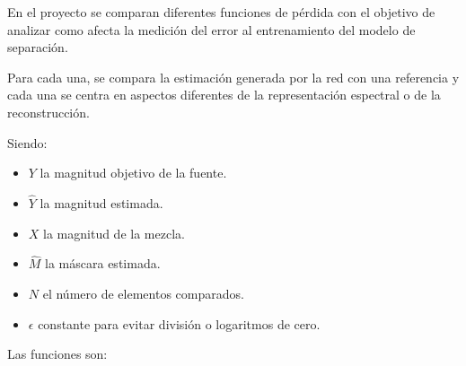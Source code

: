 En el proyecto se comparan diferentes funciones de pérdida con el objetivo de analizar como afecta la medición del error al entrenamiento del modelo de separación.

Para cada una, se compara la estimación generada por la red con una referencia y cada una se centra en aspectos diferentes de la representación espectral o de la reconstrucción.

Siendo:
\begin{itemize}
    \item $Y$ la magnitud objetivo de la fuente.
    \item $\hat{Y}$ la magnitud estimada.
    \item $X$ la magnitud de la mezcla.
    \item $\hat{M}$ la máscara estimada.
    \item $N$ el número de elementos comparados.
    \item $\epsilon$ constante para evitar división o logaritmos de cero.
\end{itemize}

Las funciones son:

